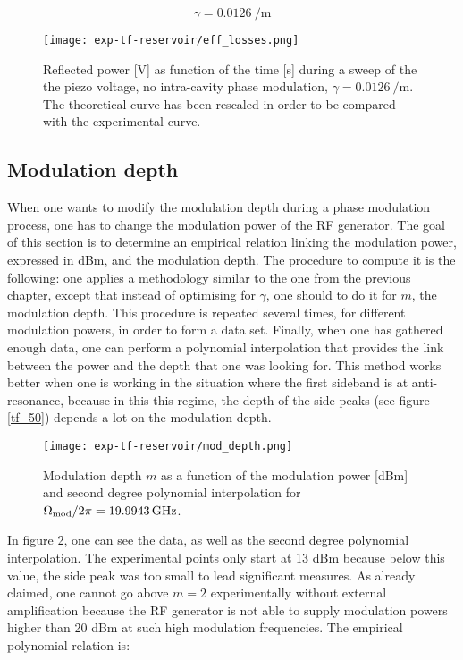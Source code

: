 \begin{equation}
	\gamma = \SI{0.0126}{\per\metre}
\end{equation}

\begin{figure}
	\centering
	\texttt{[image: exp-tf-reservoir/eff\_losses.png]}
	\caption{Reflected power [V] as function of the time [s] during a sweep of the the piezo voltage, no intra-cavity phase modulation, $\gamma = \SI{0.0126}{\per\metre}$. The theoretical curve has been rescaled in order to be compared with the experimental curve.}
	\label{eff-losses}
\end{figure}


\subsection{Modulation depth}

When one wants to modify the modulation depth during a phase modulation process, one has to change the modulation power of the RF generator. The goal of this section is to determine an empirical relation linking the modulation power, expressed in dBm, and the modulation depth. The procedure to compute it is the following: one applies a methodology similar to the one from the previous chapter, except that instead of optimising for $\gamma$, one should to do it for $m$, the modulation depth. This procedure is repeated several times, for different modulation powers, in order to form a data set. Finally, when one has gathered enough data, one can perform a polynomial interpolation that provides the link between the power and the depth that one was looking for. This method works better when one is working in the situation where the first sideband is at anti-resonance, because in this this regime, the depth of the side peaks (see figure \ref{tf_50}) depends a lot on the modulation depth.\\

\begin{figure}
	\centering
	\texttt{[image: exp-tf-reservoir/mod\_depth.png]}
	\caption{Modulation depth $m$ as a function of the modulation power [dBm] and second degree polynomial interpolation for $\Omega_{\text{mod}}/2\pi=\SI{19.9943}{\giga\hertz}$.}
	\label{mod_depth}
\end{figure}

In figure \ref{mod_depth}, one can see the data, as well as the second degree polynomial interpolation. The experimental points only start at 13 dBm because below this value, the side peak was too small to lead significant measures. As already claimed, one cannot go above $m = 2$ experimentally without external amplification because the RF generator is not able to supply modulation powers higher than 20 dBm at such high modulation frequencies. The empirical polynomial relation is:

